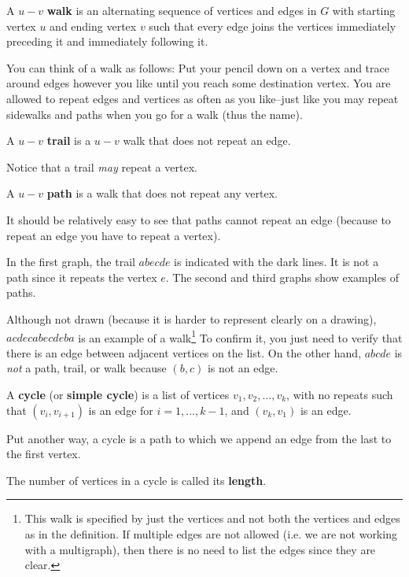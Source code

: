 \begin{df}
A $u-v$ {\bf walk}  is an
alternating sequence of vertices and edges in $G$ with starting
vertex $u$ and ending vertex $v$ such that every edge joins the
vertices immediately preceding it and immediately following it.
\end{df}
You can think of a walk as follows: Put your pencil down on a vertex and
trace around edges however you like until you reach some destination vertex.
You are allowed to repeat edges and vertices as often as you like--just like you 
may repeat sidewalks and paths when you go for a walk (thus the name).

\begin{df}
A $u-v$ {\bf trail}  is a $u-v$ walk that does not repeat an edge.
\end{df}

Notice that a trail {\em may} repeat a vertex.

\begin{df}
A $u-v$ {\bf path} is a walk that does not repeat any vertex.
\end{df}

It should be relatively easy to see that paths cannot repeat an edge
(because to repeat an edge you have to repeat a vertex).

\begin{exa}
In the first graph, the trail $abecde$ is indicated with the dark lines.
It is not a path since it repeats the vertex $e$.
The second and third graphs show examples of paths.
\begin{center}
\hspace*{.5in}
\end{center}

Although not drawn (because it is harder to represent clearly on a drawing),
$acdecabecdeba$ is an example of a walk\footnote{This walk is
specified by just the vertices and not both the vertices and edges as in the definition. 
If multiple edges are not allowed (i.e. we are not working with a multigraph), then
there is no need to list the edges since they are clear.} 
To confirm it, you just need to verify
that there is an edge between adjacent vertices on the list.
On the other hand, $abcde$ is {\em not} a path, trail, or walk
because $(b,c)$ is not an edge.
\end{exa}

\begin{df}
A {\bf cycle} (or {\bf simple cycle}) 
is a list of vertices $v_1, v_2,\ldots, v_k$, with no repeats such that 
$(v_i,v_{i+1})$ is an edge for $i=1,\ldots, k-1$, and $(v_k,v_1)$ is an edge.

Put another way, a cycle is a path to which we append an edge from the last to the first vertex.

The number of vertices in a cycle is called its {\bf length}.
\end{df}

